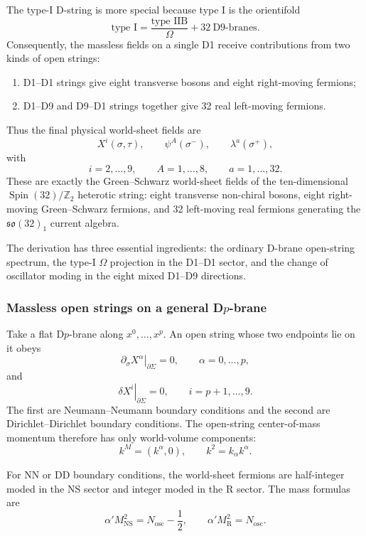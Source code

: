 \documentclass[
  10pt,
  a4paper,
  openany]{book}
\providecommand{\tightlist}{%
  \setlength{\itemsep}{0pt}\setlength{\parskip}{0pt}}
\begin{document}
The type-I D-string is more special because type I is the orientifold \[
\text{type I}
=\frac{\text{type IIB}}{\Omega}
+32\ \mathrm{D9\text{-}branes}.
\] Consequently, the massless fields on a single D1 receive
contributions from two kinds of open strings:

\begin{enumerate}
\def\labelenumi{\arabic{enumi}.}
\tightlist
\item
  D1--D1 strings give eight transverse bosons and eight right-moving
  fermions;
\item
  D1--D9 and D9--D1 strings together give 32 real left-moving fermions.
\end{enumerate}

Thus the final physical world-sheet fields are \[
\boxed{
X^i(\sigma,\tau),
\qquad
\psi^A(\sigma^-),
\qquad
\lambda^a(\sigma^+)
},
\] with \[
i=2,\ldots,9,
\qquad
A=1,\ldots,8,
\qquad
a=1,\ldots,32.
\] These are exactly the Green--Schwarz world-sheet fields of the
ten-dimensional \(\operatorname{Spin}(32)/\mathbb Z_2\) heterotic
string: eight transverse non-chiral bosons, eight right-moving
Green--Schwarz fermions, and 32 left-moving real fermions generating the
\(\mathfrak{so}(32)_1\) current algebra.

The derivation has three essential ingredients: the ordinary D-brane
open-string spectrum, the type-I \(\Omega\) projection in the D1--D1
sector, and the change of oscillator moding in the eight mixed D1--D9
directions.

\subsubsection{\texorpdfstring{Massless open strings on a general
D\(p\)-brane}{Massless open strings on a general Dp-brane}}\label{massless-open-strings-on-a-general-dp-brane}

Take a flat D\(p\)-brane along \(x^0,\ldots,x^p\). An open string whose
two endpoints lie on it obeys \[
\left.\partial_\sigma X^\alpha\right|_{\partial\Sigma}=0,
\qquad
\alpha=0,\ldots,p,
\] and \[
\left.\delta X^i\right|_{\partial\Sigma}=0,
\qquad
i=p+1,\ldots,9.
\] The first are Neumann--Neumann boundary conditions and the second are
Dirichlet--Dirichlet boundary conditions. The open-string center-of-mass
momentum therefore has only world-volume components: \[
k^M=(k^\alpha,0),
\qquad
k^2=k_\alpha k^\alpha.
\]

For NN or DD boundary conditions, the world-sheet fermions are
half-integer moded in the NS sector and integer moded in the R sector.
The mass formulas are \[
\alpha'M_{\mathrm{NS}}^2
=N_{\mathrm{osc}}-\frac12,
\qquad
\alpha'M_{\mathrm R}^2
=N_{\mathrm{osc}}.
\]
\end{document}
